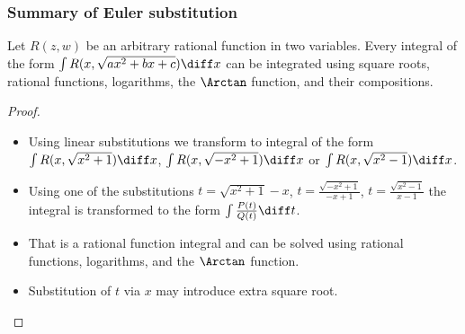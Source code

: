\begin{frame}
\frametitle{Summary of Euler substitution}

\begin{theorem}
Let $R(z,w)$ be an arbitrary rational function in two variables. Every integral of the form $\int R(x, \sqrt{ax^2+bx+c}) \diff x$ can be integrated using square roots, rational functions, logarithms, the $\Arctan$ function, and their compositions.
\end{theorem}
\begin{proof}
\begin{itemize}
\item<1-> Using linear substitutions we transform to integral of the form
$\int R(x, \sqrt{x^2+1}) \diff x$, $\int R(x, \sqrt{-x^2+1}) \diff x$ or $\int R(x, \sqrt{x^2-1}) \diff x$\quad .
\item<2-> Using one of the substitutions $t=\sqrt{x^2+1}-x$, $t=\frac{\sqrt{-x^2+1}}{-x+1}$,  $t=\frac{\sqrt{x^2-1}}{x-1}$ the integral is transformed to the form $ \int \frac{P(t)}{Q(t)}\diff t$. 
\item<3-> That is a rational function integral and can be solved using rational functions, logarithms, and the $\Arctan $ function.
\item<4-> Substitution of $t$ via $x$ may introduce extra square root.
\end{itemize}
\end{proof}
\end{frame}
